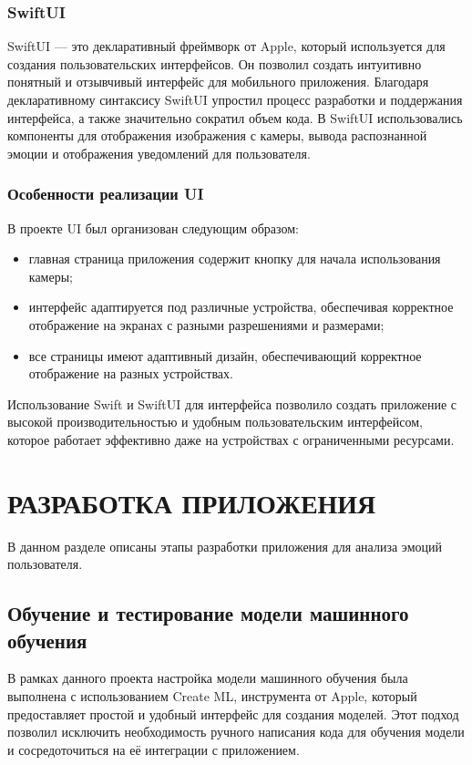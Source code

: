 {\subsubsection*{SwiftUI}
SwiftUI — это декларативный фреймворк от Apple, который используется для создания пользовательских интерфейсов. Он позволил создать интуитивно понятный и отзывчивый интерфейс для мобильного приложения. Благодаря декларативному синтаксису SwiftUI упростил процесс разработки и поддержания интерфейса, а также значительно сократил объем кода. В SwiftUI использовались компоненты для отображения изображения с камеры, вывода распознанной эмоции и отображения уведомлений для пользователя.

\subsubsection*{Особенности реализации UI}
В проекте UI был организован следующим образом:
\begin{itemize}
    \item главная страница приложения содержит кнопку для начала использования камеры;
    \item интерфейс адаптируется под различные устройства, обеспечивая корректное отображение на экранах с разными разрешениями и размерами;
    \item все страницы имеют адаптивный дизайн, обеспечивающий корректное отображение на разных устройствах.
\end{itemize}

Использование Swift и SwiftUI для интерфейса позволило создать приложение с высокой производительностью и удобным пользовательским интерфейсом, которое работает эффективно даже на устройствах с ограниченными ресурсами.

\newpage

\section{\MakeUppercase{Разработка приложения}}
В данном разделе описаны этапы разработки приложения для анализа эмоций пользователя.

\subsection{Обучение и тестирование модели машинного обучения}
{
    В рамках данного проекта настройка модели машинного обучения была выполнена с использованием Create ML, инструмента от Apple, который предоставляет простой и удобный интерфейс для создания моделей. Этот подход позволил исключить необходимость ручного написания кода для обучения модели и сосредоточиться на её интеграции с приложением.

}}
